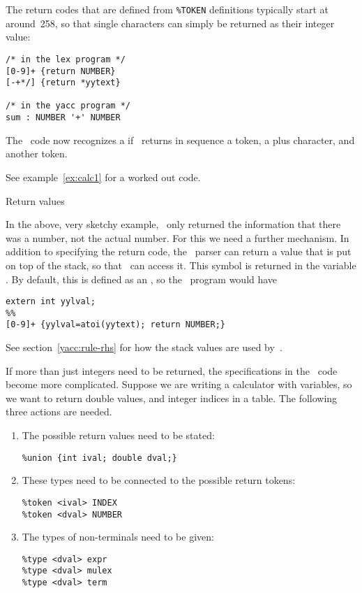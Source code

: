 The return codes that are defined from \verb+%TOKEN+ definitions typically
start at around~258, so that single characters can simply be returned
as their integer value:
\begin{verbatim}
/* in the lex program */
[0-9]+ {return NUMBER}
[-+*/] {return *yytext}

/* in the yacc program */
sum : NUMBER '+' NUMBER
\end{verbatim}
The \yacc\ code now recognizes a  if \lex\ returns in sequence
a  token, a plus character, and another  token.

See example~\ref{ex:calc1} for a worked out code.

 {Return values}

In the above, very sketchy example, \lex\ only returned the
information that there was a number, not the actual number. For this
we need a further mechanism. In addition to specifying the return
code, the \lex\ parser can return a value that is put on top of the
stack, so that \yacc\ can access it. This symbol is returned in the
variable . By default, this is defined as an , so the
\lex\ program would have
\begin{verbatim}
extern int yylval;
%%
[0-9]+ {yylval=atoi(yytext); return NUMBER;}
\end{verbatim}
See section~\ref{yacc:rule-rhs} for how the stack values are used
by~\yacc.

If more than just integers need to be returned, the specifications in
the \yacc\ code become more complicated. Suppose we are writing a
calculator with variables, so we want to return
double values, and integer indices in a table. The following three
actions are needed.
\begin{enumerate}
\item The possible return values need to be stated:
\begin{verbatim}
%union {int ival; double dval;}
\end{verbatim}
\item These types need to be connected to the possible return tokens:
\begin{verbatim}
%token <ival> INDEX
%token <dval> NUMBER
\end{verbatim}
\item The types of non-terminals need to be given:
\begin{verbatim}
%type <dval> expr
%type <dval> mulex
%type <dval> term
\end{verbatim}
\end{enumerate}

